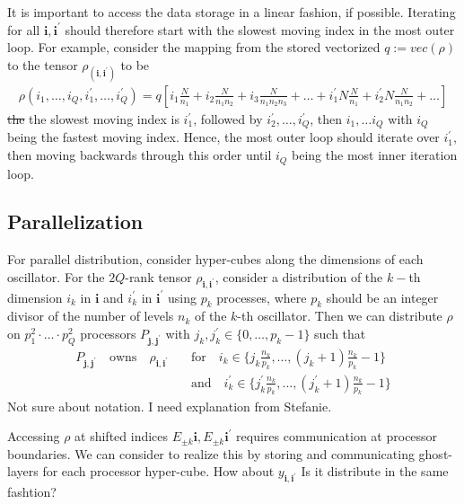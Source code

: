 \documentclass[letterpaper]{article}
\newcommand{\bfi}{\boldsymbol{i}}
\newcommand{\bfj}{\boldsymbol{j}}
\newcommand{\p}{\prime}
\newcommand{\YC}[1]{{\textcolor{Bronze}{#1}}}
\begin{document}
  It is important to access the data storage \YC{in} a linear fashion, if
  possible.  Iterating for all $\bfi, \bfi^\prime$ should therefore start with
  the slowest moving index in the most outer loop. For example, consider the
  mapping from the stored vectorized $q := vec(\rho)$ to the tensor
  $\rho_(\bfi,\bfi^\prime)$ to be
    \begin{align}
        \rho(i_1,\dots,i_Q,i_1^\prime,\dots,i_Q^\prime) = q[i_1 \frac{N}{n_1} +
        i_2\frac{N}{n_1n_2} + i_3\frac{N}{n_1n_2n_3} + \dots + i_1^\prime
        N\frac{N}{n_1} + i_2^\prime N\frac{N}{n_1n_2} + \dots]
    \end{align}
  \YC{\st{the}} the slowest moving index is $i_1^\prime$, followed by
  $i_2^\prime, \dots, i_Q^\prime$, then $i_1, \dots i_Q$ with $i_Q$ being the
  fastest moving index.  Hence, the most outer loop should iterate over
  $i_1^\prime$, then moving backwards through this order until $i_Q$ being the
  most inner iteration loop.

 \subsection{Parallelization} 
 
 For parallel distribution, consider hyper-cubes along the dimensions of each
 oscillator. For the $2Q$-rank tensor $\rho_{\bfi, \bfi^\p}$, consider a
 distribution of the $k-$th dimension $i_k$ in $\bfi$ and $i_k^\p$ in $\bfi^\p$
 using $p_k$ processes, where $p_k$ should be an integer divisor of the number
 of levels $n_k$ of the $k$-th oscillator. Then we can distribute $\rho$ on
 $p_1^2\cdot \ldots \cdot p_Q^2$ processors $P_{\bfj, \bfj^\p}$ with $j_k,
 j_k^\p \in \{0,\dots,p_k-1\}$ such that
 \begin{align}
   P_{\bfj, \bfj^\p} \quad \text{owns} \quad \rho_{\bfi, \bfi^\p} \quad
   &\text{for} \quad i_k \in \{ j_k \frac{n_k}{p_k}, \dots, \left(j_k+1\right)
   \frac{n_k}{p_k} - 1 \}\\
    &\text{and} \quad i_k^\p \in \{ j_k^\p \frac{n_k}{p_k}, \dots,
    \left(j_k^\p+1\right) \frac{n_k}{p_k} - 1 \}
 \end{align}
 \YC{Not sure about notation. I need explanation from Stefanie.}

 Accessing $\rho$ at shifted indices $E_{\pm k}\bfi, E_{\pm k}\bfi^\p$ requires
 communication at processor boundaries. We can consider to realize this by
 storing and communicating ghost-layers for each processor hyper-cube.
 \YC{How about $y_{\bfi,\bfi^\prime}$ Is it distribute in the same fashtion?}
\end{document}

